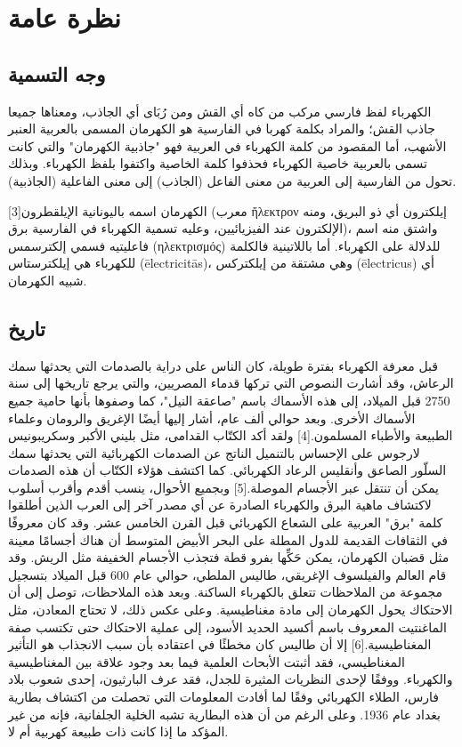 \documentclass[a4paper]{book}
\begin{document}
\mainmatter

\chapter{نظرة عامة}

\section{وجه التسمية}

الكهرباء لفظ فارسي مركب من کاه أي القش ومن رُبَای أي الجاذب، ومعناها
جميعا جاذب القش؛ والمراد بكلمة کهربا في الفارسية هو الكهرمان المسمى
بالعربية العنبر الأشهب، أما المقصود من كلمة الكهرباء في العربية فهو
"جاذبية الكهرمان" والتي كانت تسمى بالعربية خاصية الكهرباء فحذفوا كلمة
الخاصية واكتفوا بلفظ الكهرباء. وبذلك تحول من الفارسية إلى العربية من
معنى الفاعل (الجاذب) إلى معنى الفاعلية (الجاذبية).

الكهرمان اسمه باليونانية الإيلقطرون[3] (معرب ἤλεκτρον إيلكترون أي ذو
البريق، ومنه الإلكترون عند الفيزيائيين، وعليه تسمية الكهرباء في
الفارسية برق)، واشتق منه اسم فاعليتيه فسمي إلكترسمس (ηλεκτρ‌ισμός)
للدلالة على الكهرباء. أما باللاتينية فالكلمة للكهرباء هي إيلكترستاس
(ēlectricitās)، وهي مشتقة من إيلكتركس (ēlectricus) أي شبيه الكهرمان.

\section{تاريخ}

قبل معرفة الكهرباء بفترة طويلة، كان الناس على دراية بالصدمات التي
يحدثها سمك الرعاش، وقد أشارت النصوص التي تركها قدماء المصريين، والتي
يرجع تاريخها إلى سنة 2750 قبل الميلاد، إلى هذه الأسماك باسم "صاعقة
النيل"، كما وصفوها بأنها حامية جميع الأسماك الأخرى. وبعد حوالي ألف
عام، أشار إليها أيضًا الإغريق والرومان وعلماء الطبيعة والأطباء
المسلمون.[4] ولقد أكد الكتّاب القدامى، مثل بليني الأكبر وسكريبونيس
لارجوس على الإحساس بالتنميل الناتج عن الصدمات الكهربائية التي يحدثها
سمك السلّور الصاعق وأنقليس الرعاد الكهربائي. كما اكتشف هؤلاء الكتّاب أن
هذه الصدمات يمكن أن تنتقل عبر الأجسام الموصلة.[5] وبجميع الأحوال، ينسب
أقدم وأقرب أسلوب لاكتشاف ماهية البرق والكهرباء الصادرة عن أي مصدر آخر
إلى العرب الذين أطلقوا كلمة "برق" العربية على الشعاع الكهربائي قبل
القرن الخامس عشر. وقد كان معروفًا في الثقافات القديمة للدول المطلة على
البحر الأبيض المتوسط أن هناك أجسامًا معينة مثل قضبان الكهرمان، يمكن
حَكِّها بفرو قطة فتجذب الأجسام الخفيفة مثل الريش. وقد قام العالم
والفيلسوف الإغريقي، طاليس الملطي، حوالي عام 600 قبل الميلاد بتسجيل
مجموعة من الملاحظات تتعلق بالكهرباء الساكنة. وبعد هذه الملاحظات، توصل
إلى أن الاحتكاك يحول الكهرمان إلى مادة مغناطيسية. وعلى عكس ذلك، لا
تحتاج المعادن، مثل الماغنتيت المعروف باسم أكسيد الحديد الأسود، إلى
عملية الاحتكاك حتى تكتسب صفة المغناطيسية.[6] إلا أن طاليس كان مخطئًا في
اعتقاده بأن سبب الانجذاب هو التأثير المغناطيسي، فقد أثبتت الأبحاث
العلمية فيما بعد وجود علاقة بين المغناطيسية والكهرباء. ووفقًا لإحدى
النظريات المثيرة للجدل، فقد عرف البارثيون، إحدى شعوب بلاد فارس، الطلاء
الكهربائي وفقًا لما أفادت المعلومات التي تحصلت من اكتشاف بطارية بغداد
عام 1936. وعلى الرغم من أن هذه البطارية تشبه الخلية الجلفانية، فإنه من
غير المؤكد ما إذا كانت ذات طبيعة كهربية أم لا.
\end{document}
